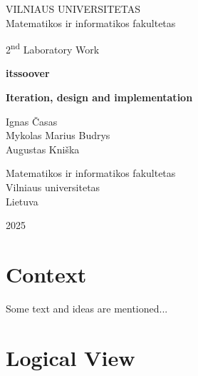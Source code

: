 \documentclass[11pt,a4paper]{article}
\begin{document}

\begin{titlepage}
    \centering
    \thispagestyle{empty}
    
    {\Large VILNIAUS UNIVERSITETAS\\
    Matematikos ir informatikos fakultetas}\par
    
    \vspace{3cm} %
    
    {\Large 2\textsuperscript{nd} Laboratory Work}\par
    \vspace{0.5cm}
    {\Large \textbf{itssoover}}\par
    {\Large \textbf{Iteration, design and implementation}}\par
    
    \vspace{3cm}
    
    {\large
    Ignas Časas\\
    Mykolas Marius Budrys\\
    Augustas Kniška
    }\par
    
    \vspace{8cm}
    
    {\large
    Matematikos ir informatikos fakultetas\\
    Vilniaus universitetas\\
    Lietuva
    }\par
    
    \vfill

    \large 2025
    
\end{titlepage}

\section{Context}
 Some text and ideas are mentioned...

\section{Logical View}
\end{document}
